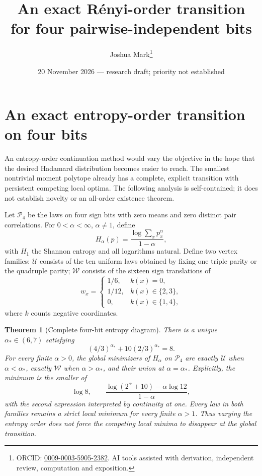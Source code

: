 \documentclass[11pt]{article}
\title{An exact R\'enyi-order transition\\for four pairwise-independent bits}
\author{Joshua Mark\thanks{ORCID: \href{https://orcid.org/0009-0003-5905-2382}{0009-0003-5905-2382}. AI tools assisted with derivation, independent review, computation and exposition.}}
\date{20 November 2026 --- research draft; priority not established}
\newtheorem{theorem}{Theorem}[section]
\begin{document}
\maketitle
\section{An exact entropy-order transition on four bits}
\label{sec:renyi-phase}
An entropy-order continuation method would vary the objective in the
hope that the desired Hadamard distribution becomes easier to reach.
The smallest nontrivial moment polytope already has a complete,
explicit transition with persistent competing local optima. The
following analysis is self-contained; it does not establish novelty
or an all-order existence theorem.

Let $\mathcal P_4$ be the laws on four sign bits with zero means and
zero distinct pair correlations. For $0<\alpha<\infty$, $\alpha\ne1$,
define
\[
 H_\alpha(p)=\frac{\log\sum_xp_x^\alpha}{1-\alpha},
\]
with $H_1$ the Shannon entropy and all logarithms natural.
Define two vertex families: $\mathcal U$ consists of the ten uniform
laws obtained by fixing one triple parity or the quadruple parity;
$\mathcal W$ consists of the sixteen sign translations of
\[
 w_x=\begin{cases}
 1/6,&k(x)=0,\\
 1/12,&k(x)\in\{2,3\},\\
 0,&k(x)\in\{1,4\},
 \end{cases}
\]
where $k$ counts negative coordinates.

\begin{theorem}[Complete four-bit entropy diagram]\label{thm:renyi-phase}
There is a unique $\alpha_*\in(6,7)$ satisfying
\[
 (4/3)^{\alpha_*}+10(2/3)^{\alpha_*}=8.
\]
For every finite $\alpha>0$, the global minimizers of $H_\alpha$ on
$\mathcal P_4$ are exactly $\mathcal U$ when $\alpha<\alpha_*$,
exactly $\mathcal W$ when $\alpha>\alpha_*$, and their union at
$\alpha=\alpha_*$. Explicitly, the minimum is the smaller of
\[
 \log8,\qquad
 \frac{\log(2^\alpha+10)-\alpha\log12}{1-\alpha},
\]
with the second expression interpreted by continuity at one.
Every law in both families remains a strict local minimum for every
finite $\alpha>1$. Thus varying the entropy order does not force
the competing local minima to disappear at the global transition.
\end{theorem}
\end{document}
